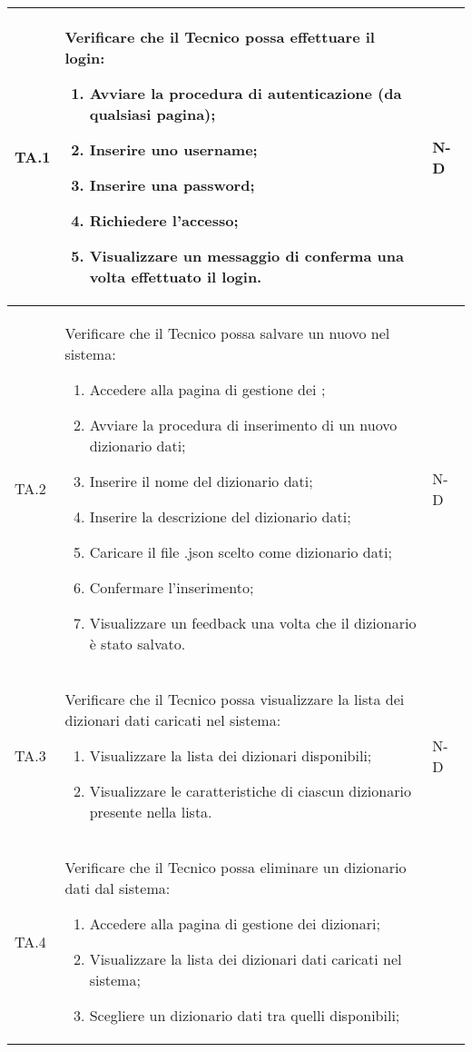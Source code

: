 \begin{adjustwidth}{-0.5cm}{-0.5cm}
\begin{longtable}{|P{1.5cm}|>{\raggedright}P{9.5cm}|>{\arraybackslash}P{1.5cm}|}
		TA.1 & Verificare che il Tecnico possa effettuare il login:
		\begin{enumerate}
			\item Avviare la procedura di autenticazione (da qualsiasi pagina);
			\item Inserire uno username;
			\item Inserire una password;
			\item Richiedere l'accesso;
			\item Visualizzare un messaggio di conferma una volta effettuato il login.
		\end{enumerate}
		& N-D \\
		\hline TA.2 & Verificare che il Tecnico possa salvare un nuovo  nel sistema:
		\begin{enumerate}
			\item Accedere alla pagina di gestione dei ;
			\item Avviare la procedura di inserimento di un nuovo dizionario dati;
			\item Inserire il nome del dizionario dati;
			\item Inserire la descrizione del dizionario dati;
			\item Caricare il file .json scelto come dizionario dati;
			\item Confermare l'inserimento;
			\item Visualizzare un feedback una volta che il dizionario è stato salvato.
		\end{enumerate}
		& N-D \\
		\hline TA.3 & Verificare che il Tecnico possa visualizzare la lista dei dizionari dati caricati nel sistema:
		\begin{enumerate}
			\item Visualizzare la lista dei dizionari disponibili;
			\item Visualizzare le caratteristiche di ciascun dizionario presente nella lista.
		\end{enumerate}
		& N-D \\
		\hline TA.4 & Verificare che il Tecnico possa eliminare un dizionario dati dal sistema:
		\begin{enumerate}
			\item Accedere alla pagina di gestione dei dizionari;
			\item Visualizzare la lista dei dizionari dati caricati nel sistema;
			\item Scegliere un dizionario dati tra quelli disponibili;

\end{enumerate}
\end{longtable}
\end{adjustwidth}
